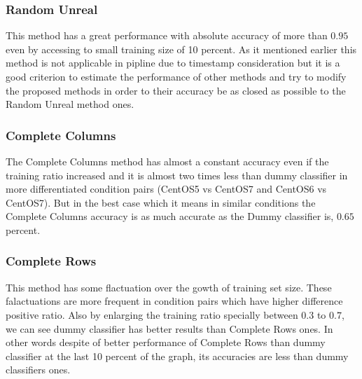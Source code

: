 \documentclass[10pt, conference, compsocconf]{IEEEtran}
\begin{document}
\subsubsection{Random Unreal}
This method has a great performance with absolute accuracy of more than $0.95$ 
even by accessing to small training size of 10 percent. As it mentioned earlier 
this method is not applicable in pipline due to timestamp consideration but it 
is a good criterion to estimate the performance of other methods and try to modify 
the proposed methods in order to their accuracy be as closed as possible to the 
Random Unreal method ones.  


\subsubsection{Complete Columns}
The Complete Columns method has almost a constant accuracy even if the training ratio increased and it
is almost two times less than dummy classifier in more differentiated
condition pairs (CentOS5 vs CentOS7 and CentOS6 vs CentOS7). But in the
best case which it means in similar conditions the Complete Columns
accuracy is as much accurate as the Dummy classifier is, $0.65$
percent.
\\
\subsubsection{Complete Rows}
This method has some flactuation over the gowth of training set size. These falactuations are more 
frequent in condition pairs which have higher difference positive ratio. 
Also by enlarging the training ratio specially between $0.3$ to $0.7$, 
we can see dummy classifier has better results than Complete Rows ones. 
In other words despite of better performance of Complete Rows than 
dummy classifier at the last 10 percent of the graph, its accuracies 
are less than dummy classifiers ones.  
\\
\end{document}
